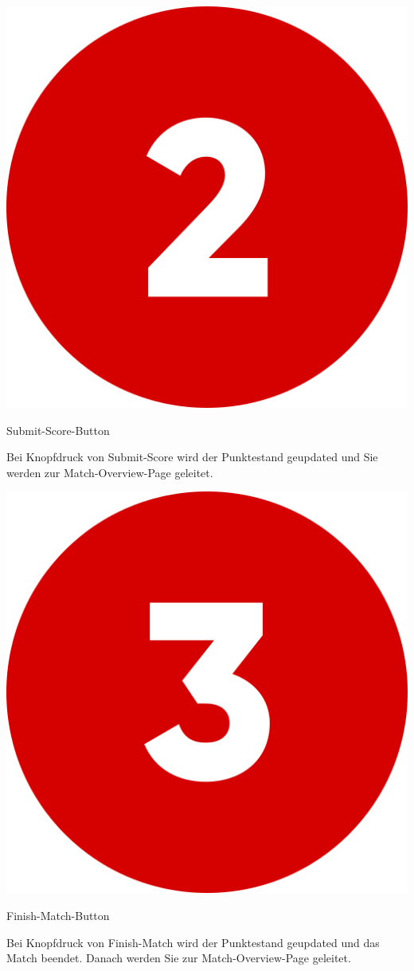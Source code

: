 \bigskip
\includegraphics[scale=0.05]{pics/user-guide/numbers/number-2.png} \begin{LARGE} Submit-Score-Button \end{LARGE}

Bei Knopfdruck von Submit-Score wird der Punktestand geupdated und Sie werden zur Match-Overview-Page geleitet.

\bigskip
\includegraphics[scale=0.05]{pics/user-guide/numbers/number-3.png} \begin{LARGE} Finish-Match-Button \end{LARGE}

Bei Knopfdruck von Finish-Match wird der Punktestand geupdated und das Match beendet. Danach werden Sie zur Match-Overview-Page geleitet.